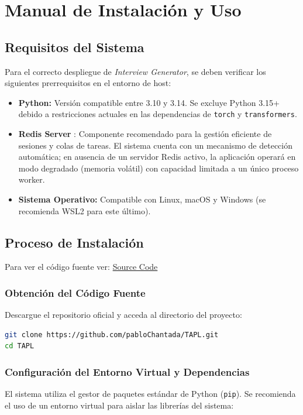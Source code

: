 \documentclass[12pt, a4paper]{article}
\begin{document}
\section{Manual de Instalación y Uso}

\subsection{Requisitos del Sistema}
Para el correcto despliegue de \textit{Interview Generator}, se deben verificar los siguientes prerrequisitos en el entorno de host:
\begin{itemize}
    \item \textbf{Python:} Versión compatible entre 3.10 y 3.14. Se excluye Python 3.15+ debido a restricciones actuales en las dependencias de \texttt{torch} y \texttt{transformers}.
    \item \textbf{Redis Server} \cite{redis2024}: Componente recomendado para la gestión eficiente de sesiones y colas de tareas. El sistema cuenta con un mecanismo de detección automática; en ausencia de un servidor Redis activo, la aplicación operará en modo degradado (memoria volátil) con capacidad limitada a un único proceso worker.
    \item \textbf{Sistema Operativo:} Compatible con Linux, macOS y Windows (se recomienda WSL2 para este último).
\end{itemize}

\subsection{Proceso de Instalación}
Para ver el código fuente ver: \href{https://github.com/pabloChantada/TAPL}{Source Code}
\subsubsection{Obtención del Código Fuente}
Descargue el repositorio oficial y acceda al directorio del proyecto:
\begin{lstlisting}[language=bash]
git clone https://github.com/pabloChantada/TAPL.git
cd TAPL
\end{lstlisting}

\subsubsection{Configuración del Entorno Virtual y Dependencias}
El sistema utiliza el gestor de paquetes estándar de Python (\texttt{pip}). Se recomienda el uso de un entorno virtual para aislar las librerías del sistema:
\end{document}
